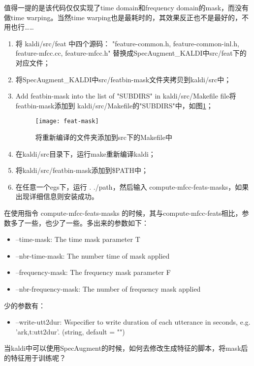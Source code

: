 值得一提的是该代码仅仅实现了time domain和frequency domain的mask，而没有做time warping。当然time warping也是最耗时的，其效果反正也不是最好的，不用也行……

\begin{enumerate}
  \item 将 kaldi/src/feat 中四个源码： "feature-common.h, feature-common-inl.h, feature-mfcc.cc, feature-mfcc.h" 替换成SpecAugment\_KALDI中src/feat下的对应文件；
  \item 将SpecAugment\_KALDI中src/featbin-mask文件夹拷贝到kaldi/src中；
  \item Add featbin-mask into the list of "SUBDIRS" in kaldi/src/Makefile file将featbin-mask添加到 kaldi/src/Makefile的"SUBDIRS"中，如图\ref{fig:feat-mask}；
  \begin{figure}[h]
  \centering
  \texttt{[image: feat-mask]}
  \caption{将重新编译的文件夹添加到src下的Makefile中 \label{fig:feat-mask}}
  \end{figure}
  \item 在kaldi/src目录下，运行make重新编译kaldi；
  \item 将kaldi/src/featbin-mask添加到\$PATH中；
  \item 在任意一个egs下，运行 . ./path，然后输入 compute-mfcc-feats-masks，如果出现详细信息则安装成功。
\end{enumerate}

在使用指令 compute-mfcc-feats-masks 的时候，其与compute-mfcc-feats相比，参数多了一些，也少了一些。多出来的参数如下：
\begin{itemize}
  \item --time-mask: The time mask parameter T
  \item --nbr-time-mask: The number time of mask applied
  \item --frequency-mask: The frequency mask parameter F
  \item --nbr-frequency-mask: The number of frequency mask applied
\end{itemize}

少的参数有：
\begin{itemize}
  \item --write-utt2dur: Wspecifier to write duration of each utterance in seconds, e.g. 'ark,t:utt2dur'. (string, default = "")
\end{itemize}


当kaldi中可以使用SpecAugment的时候，如何去修改生成特征的脚本，将mask后的特征用于训练呢？

